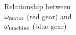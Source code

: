 \documentclass[12pt]{article}
\begin{document}
\begin{landscape}
\begin{minipage}{0.5\textheight}
\begin{center}
	\end{center}
\end{minipage}
\begin{minipage}{0.5\textheight}
	\begin{center}
		\large
		Relationship between \\ $\omega_{\rm{motor}}$ (red gear) and \\$\omega_{\rm{machine}}$ (blue gear)
		
		\vspace{2in}
		
		\underline{\hspace{3in}}
		
	\end{center}
\end{minipage}
\end{landscape}

\vspace{2in}
\end{document}
